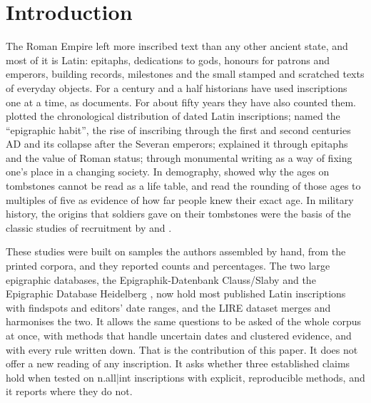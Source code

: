 \section{Introduction}
The Roman Empire left more inscribed text than any other ancient state, and most of it is Latin: epitaphs, dedications to gods, honours for patrons and emperors, building records, milestones and the small stamped and scratched texts of everyday objects. For a century and a half historians have used inscriptions one at a time, as documents. For about fifty years they have also counted them. \citet{mrozek1973} plotted the chronological distribution of dated Latin inscriptions; \citet{macmullen1982} named the ``epigraphic habit'', the rise of inscribing through the first and second centuries AD and its collapse after the Severan emperors; \citet{meyer1990} explained it through epitaphs and the value of Roman status; \citet{woolf1996} through monumental writing as a way of fixing one's place in a changing society. In demography, \citet{hopkins1966} showed why the ages on tombstones cannot be read as a life table, and \citet{duncanjones1977} read the rounding of those ages to multiples of five as evidence of how far people knew their exact age. In military history, the origins that soldiers gave on their tombstones were the basis of the classic studies of recruitment by \citet{forni1953} and \citet{mann1983}.

These studies were built on samples the authors assembled by hand, from the printed corpora, and they reported counts and percentages. The two large epigraphic databases, the Epigraphik-Datenbank Clauss/Slaby \citep[EDCS;][]{edcs} and the Epigraphic Database Heidelberg \citep[EDH;][]{edh}, now hold most published Latin inscriptions with findspots and editors' date ranges, and the LIRE dataset \citep{kase2023lire} merges and harmonises the two. It allows the same questions to be asked of the whole corpus at once, with methods that handle uncertain dates and clustered evidence, and with every rule written down. That is the contribution of this paper. It does not offer a new reading of any inscription. It asks whether three established claims hold when tested on {{n.all|int}} inscriptions with explicit, reproducible methods, and it reports where they do not.

